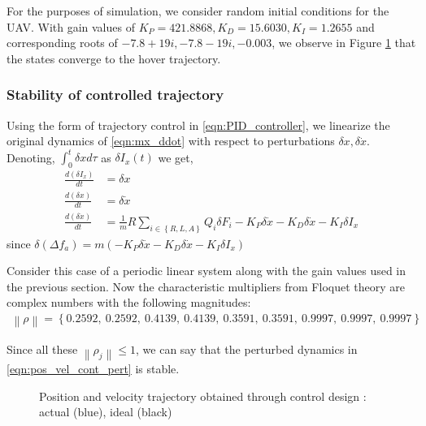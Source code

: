 \documentclass[10pt]{article}
\newcommand{\norm}[1]{\ensuremath{\left\| #1 \right\|}}
\newcommand{\braces}[1]{\ensuremath{\left\{ #1 \right\}}}
\begin{document}
%
For the purposes of simulation, we consider random initial conditions for the UAV. With gain values of $ K_P = 421.8868, K_D = 15.6030, K_I = 1.2655 $ and corresponding roots of $ -7.8 + 19i, -7.8 - 19i, -0.003 $, we observe in Figure \ref{fig:hover_control} that the states converge to the hover trajectory.

\subsubsection{Stability of controlled trajectory}
Using the form of trajectory control in \eqref{eqn:PID_controller}, we linearize the original dynamics of \eqref{eqn:mx_ddot} with respect to perturbations $ \delta x, \delta \dot{x} $. Denoting, $ \int_0^{t} \delta x d \tau $ as $ \delta I_x(t) $ we get,
\begin{equation}\label{eqn:pos_vel_cont_pert}
\begin{aligned}
	\frac{d (\delta I_x)}{dt} &= \delta x \\
	\frac{d (\delta x)}{dt} &= \delta \dot{x} \\
	\frac{d (\delta \dot{x})}{dt} &= \frac{1}{m} R \sum_{i\in \braces{R, L, A}}Q_i \delta F_i - K_P \delta \dot{x} - K_D \delta \dot{x} - K_I \delta I_x
\end{aligned}
\end{equation}
since $ \delta (\Delta f_a) = m(-K_P \delta \dot{x} - K_D \delta \dot{x} - K_I \delta I_x) $

Consider this case of a periodic linear system along with the gain values used in the previous section. Now the characteristic multipliers from Floquet theory are complex numbers with the following magnitudes:
\begin{gather*}
	\norm{\rho} = \braces{0.2592,\ 0.2592,\	0.4139,\ 0.4139,\ 0.3591,\ 0.3591,\	0.9997,\ 0.9997,\ 0.9997}
\end{gather*}

Since all these $ \norm{\rho_j} \le 1 $, we can say that the perturbed dynamics in \eqref{eqn:pos_vel_cont_pert} is stable.

\begin{figure}[h!]
	\centerline{
		\hfill
	}
	\caption{Position and velocity trajectory obtained through control design : actual (blue), ideal (black)}
	\label{fig:hover_control}
\end{figure}
\end{document}
